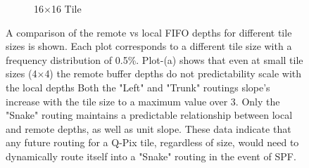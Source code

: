 \begin{figure}
\begin{subfigure}[b]{0.475\textwidth}
      \caption[]%
      {\small 16$\times$16 Tile}    
  \end{subfigure}
  \caption[]
  {\small A comparison of the remote vs local FIFO depths for different tile sizes is shown.
  Each plot corresponds to a different tile size with a frequency distribution of 0.5\%.
  Plot-(a) shows that even at small tile sizes (4$\times$4) the remote buffer depths do not predictability scale with the local depths
  Both the "Left" and "Trunk" routings slope's increase with the tile size to a maximum value over 3.
  Only the "Snake" routing maintains a predictable relationship between local and remote depths, as well as unit slope.
  These data indicate that any future routing for a Q-Pix tile, regardless of size, would need to dynamically route itself into a "Snake" routing in the event of SPF.
  } 
  \label{fig:compare_slow_plots_for_digital_sim_slow}
\end{figure}

